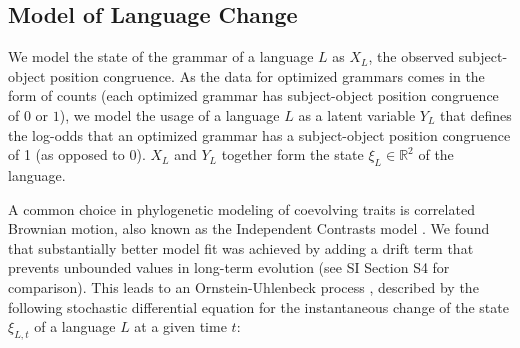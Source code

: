 \documentclass[9pt,twocolumn,twoside,lineno]{pnas-new}
\begin{document}
{\subsection*{Model of Language Change}



We model the state of the grammar of a language $L$ as $X_L$, the observed subject-object position congruence.
As the data for optimized grammars comes in the form of counts (each optimized grammar has subject-object position congruence of $0$ or $1$), we model the usage of a language $L$ as a latent variable $Y_L$ that defines the log-odds that an optimized grammar has a subject-object position congruence of 1 (as opposed to 0).
$X_L$ and $Y_L$ together form the state $\xi_L \in \mathbb{R}^2$  of the language.



A common choice in phylogenetic modeling of coevolving traits is correlated Brownian motion, also known as the Independent Contrasts model \citep{felsenstein1973maximum,freckleton2012fast}.
We found that substantially better model fit was achieved by adding a drift term that prevents unbounded values  in long-term evolution (see SI Section S4 for comparison).
This leads to an Ornstein-Uhlenbeck process \citep{felsenstein1988phylogenies,hansen1997stabilizing,blackwell2003bayesian}, described by the following stochastic differential equation for the instantaneous change of the state $\xi_{L,t}$ of a language $L$ at a given time $t$:

}
\end{document}
